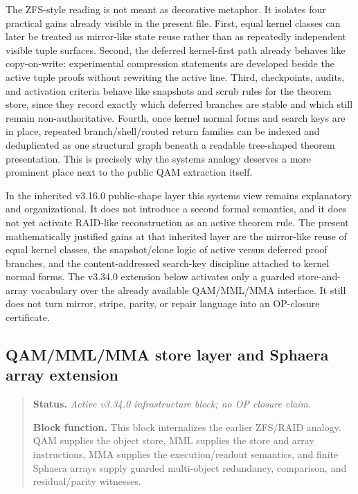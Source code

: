 \begin{remark}\label{rem:qam-zfs-utility}
The ZFS-style reading is not meant as decorative metaphor. It isolates four practical gains already visible in the present file. First, equal kernel classes can later be treated as mirror-like state reuse rather than as repeatedly independent visible tuple surfaces. Second, the deferred kernel-first path already behaves like copy-on-write: experimental compression statements are developed beside the active tuple proofs without rewriting the active line. Third, checkpoints, audits, and activation criteria behave like snapshots and scrub rules for the theorem store, since they record exactly which deferred branches are stable and which still remain non-authoritative. Fourth, once kernel normal forms and search keys are in place, repeated branch/shell/routed return families can be indexed and deduplicated as one structural graph beneath a readable tree-shaped theorem presentation. This is precisely why the systems analogy deserves a more prominent place next to the public QAM extraction itself.
\end{remark}

\begin{remark}\label{rem:qam-vm-os-scope}
In the inherited v3.16.0 public-shape layer this systems view remains explanatory and organizational. It does not introduce a second formal semantics, and it does not yet activate RAID-like reconstruction as an active theorem rule. The present mathematically justified gains at that inherited layer are the mirror-like reuse of equal kernel classes, the snapshot/clone logic of active versus deferred proof branches, and the content-addressed search-key discipline attached to kernel normal forms. The v3.34.0 extension below activates only a guarded store-and-array vocabulary over the already available QAM/MML/MMA interface. It still does not turn mirror, stripe, parity, or repair language into an OP-closure certificate.
\end{remark}


\subsection*{QAM/MML/MMA store layer and Sphaera array extension}
\begin{quote}\small
\noindent\textbf{Status.} \emph{Active v3.34.0 infrastructure block; no OP closure claim.}\par
\noindent\textbf{Block function.} This block internalizes the earlier ZFS/RAID analogy. QAM supplies the object store, MML supplies the store and array instructions, MMA supplies the execution/readout semantics, and finite Sphaera arrays supply guarded multi-object redundancy, comparison, and residual/parity witnesses.
\end{quote}

